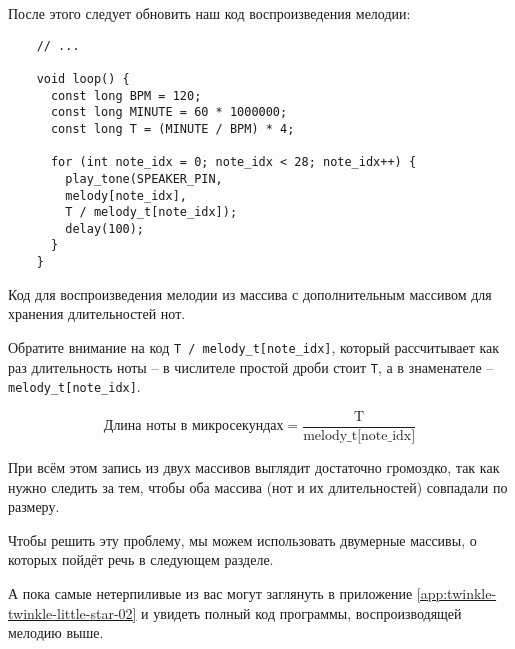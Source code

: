 \documentclass[../sparc.tex]{subfiles}
\begin{document}
После этого следует обновить наш код воспроизведения мелодии:

\begin{listing}[ht]
  \begin{verbatim}
    // ...

    void loop() {
      const long BPM = 120;
      const long MINUTE = 60 * 1000000;
      const long T = (MINUTE / BPM) * 4;

      for (int note_idx = 0; note_idx < 28; note_idx++) {
        play_tone(SPEAKER_PIN,
        melody[note_idx],
        T / melody_t[note_idx]);
        delay(100);
      }
    }
  \end{verbatim}
  \label{listing:music-array-example-5}
  \caption{Код для воспроизведения мелодии из массива с дополнительным массивом
    для хранения длительностей нот.}
\end{listing}

Обратите внимание на код \texttt{T / melody\_t[note\_idx]}, который рассчитывает
как раз длительность ноты -- в числителе простой дроби стоит \texttt{T}, а в
знаменателе -- \texttt{melody\_t[note\_idx]}.

\begin{equation}
  \mbox{Длина ноты в микросекундах} = \frac{\mbox{T}}{\mbox{melody\_t[note\_idx]}}
\end{equation}

При всём этом запись из двух массивов выглядит достаточно громоздко, так как
нужно следить за тем, чтобы оба массива (нот и их длительностей) совпадали по
размеру.

Чтобы решить эту проблему, мы можем использовать двумерные массивы, о которых
пойдёт речь в следующем разделе.

А пока самые нетерпиливые из вас могут заглянуть в приложение
\ref{app:twinkle-twinkle-little-star-02} и увидеть полный код программы,
воспроизводящей мелодию выше.
\end{document}
